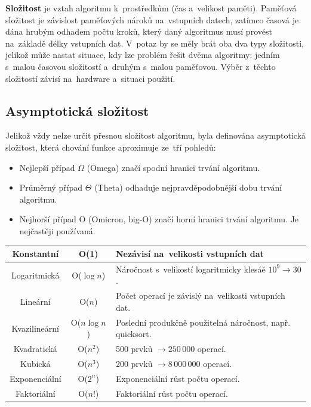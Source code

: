 \textbf{Složitost} je vztah algoritmu k~prostředkům (čas a~velikost paměti). Paměťová složitost je závislost paměťových nároků na~vstupních datech, zatímco časová je dána hrubým odhadem počtu kroků, který daný algoritmus musí provést na~základě délky vstupních dat. V~potaz by se měly brát oba dva typy složitosti, jelikož může nastat situace, kdy lze problém řešit dvěma algoritmy: jedním s~malou časovou složitostí a~druhým s~malou paměťovou. Výběr z~těchto složitostí závisí na~hardware a~situaci použití.

\subsection{Asymptotická složitost}

Jelikož vždy nelze určit přesnou složitost algoritmu, byla definována asymptotická složitost, která chování funkce aproximuje ze~tří pohledů:

\begin{itemize}
	\item Nejlepší případ $\Omega$ (Omega) značí spodní hranici trvání algoritmu.
	\item Průměrný případ $\Theta$ (Theta) odhaduje nejpravděpodobnější dobu trvání algoritmu.
	\item Nejhorší případ O (Omicron, big-O) značí horní hranici trvání algoritmu. Je nejčastěji používaná.
\end{itemize}

\begin{table}[h]
	\begin{tabularx}{\textwidth}{|c|c|X|}\hline
		Konstantní    & O(1)          & Nezávisí na~velikosti vstupních dat \\\hline
		Logaritmická  & O($\log{n}$)  & Náročnost s~velikostí logaritmicky klesáě $10^9 \rightarrow 30$. \\\hline
		Lineární      & O($n$)        & Počet operací je závislý na~velikosti vstupních dat. \\\hline
		Kvazilineární & O($n\log{n}$) & Poslední produkčně použitelná náročnost, např. quicksort. \\\hline
		Kvadratická   & O($n^2$)      & 500 prvků $\rightarrow 250\,000$ operací. \\\hline
		Kubická       & O($n^3$)      & 200 prvků $\rightarrow 8\,000\,000$ operací. \\\hline
		Exponenciální & O($2^n$)      & Exponenciální růst počtu operací. \\\hline
		Faktoriální   & O($n!$)       & Faktoriální růst počtu operací. \\\hline
	\end{tabularx}
\end{table}


